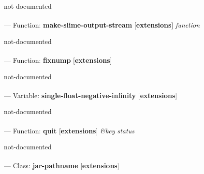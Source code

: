 \begin{adjustwidth}{5em}{5em}
not-documented
\end{adjustwidth}

\paragraph{}
\label{EXTENSIONS:MAKE-SLIME-OUTPUT-STREAM}
--- Function: \textbf{make-slime-output-stream} [\textbf{extensions}] \textit{function}

\begin{adjustwidth}{5em}{5em}
not-documented
\end{adjustwidth}

\paragraph{}
\label{EXTENSIONS:FIXNUMP}
--- Function: \textbf{fixnump} [\textbf{extensions}] \textit{}

\begin{adjustwidth}{5em}{5em}
not-documented
\end{adjustwidth}

\paragraph{}
\label{EXTENSIONS:SINGLE-FLOAT-NEGATIVE-INFINITY}
--- Variable: \textbf{single-float-negative-infinity} [\textbf{extensions}] \textit{}

\begin{adjustwidth}{5em}{5em}
not-documented
\end{adjustwidth}

\paragraph{}
\label{EXTENSIONS:QUIT}
--- Function: \textbf{quit} [\textbf{extensions}] \textit{\&key status}

\begin{adjustwidth}{5em}{5em}
not-documented
\end{adjustwidth}

\paragraph{}
\label{EXTENSIONS:JAR-PATHNAME}
--- Class: \textbf{jar-pathname} [\textbf{extensions}] \textit{}

